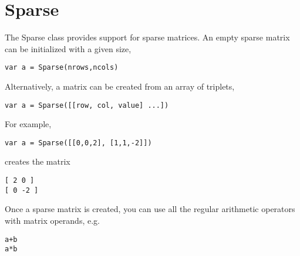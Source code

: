 \hypertarget{sparse}{%
\section{Sparse}\label{sparse}}

The Sparse class provides support for sparse matrices. An empty sparse
matrix can be initialized with a given size,

\begin{lstlisting}
var a = Sparse(nrows,ncols)
\end{lstlisting}

Alternatively, a matrix can be created from an array of triplets,

\begin{lstlisting}
var a = Sparse([[row, col, value] ...])
\end{lstlisting}

For example,

\begin{lstlisting}
var a = Sparse([[0,0,2], [1,1,-2]])
\end{lstlisting}

creates the matrix

\begin{lstlisting}
[ 2 0 ]
[ 0 -2 ]
\end{lstlisting}

Once a sparse matrix is created, you can use all the regular arithmetic
operators with matrix operands, e.g.

\begin{lstlisting}
a+b
a*b
\end{lstlisting}
